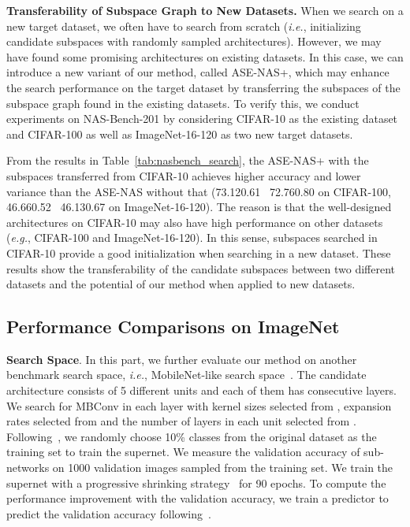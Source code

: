 \documentclass[lettersize,journal]{IEEEtran}
\newcommand{\sexyname}{ASE-NAS\xspace}
\newcommand{\sexynameplus}{ASE-NAS+\xspace}
\def\eg{\emph{e.g.}} \def\Eg{\emph{E.g.}}
\def\ie{\emph{i.e.}} \def\Ie{\emph{I.e.}}
\begin{document}
\textbf{Transferability of Subspace Graph to New Datasets.}
When we search on a new target dataset, we often have to search from scratch (\ie, initializing candidate subspaces with randomly sampled architectures).
However, we may have found some promising architectures on existing datasets.
In this case, we can introduce a new variant of our method, called \sexynameplus, which may enhance the search performance on the target dataset by transferring the subspaces of the subspace graph found in the existing datasets.
To verify this, we conduct experiments on NAS-Bench-201 by considering CIFAR-10 as the existing dataset and CIFAR-100 as well as ImageNet-16-120 as two new target datasets.

From the results in Table~\ref{tab:nasbench_search}, the \sexynameplus with the subspaces transferred from CIFAR-10 achieves higher accuracy and lower variance than the \sexyname without that (73.12{0.61} \vs~72.76{0.80} on CIFAR-100, 46.66{0.52} \vs~46.13{0.67} on ImageNet-16-120).
The reason is that the well-designed architectures on CIFAR-10 may also have high performance on other datasets (\eg, CIFAR-100 and ImageNet-16-120).
In this sense, subspaces searched in CIFAR-10 provide a good initialization when searching in a new dataset.
These results show the transferability of the candidate subspaces between two different datasets and the potential of our method when applied to new datasets.


\subsection{Performance Comparisons on ImageNet}

\textbf{Search Space}.
In this part, we further evaluate our method on another benchmark search space, \ie, MobileNet-like search space~\cite{howard2019searching}.
The candidate architecture consists of 5 different units and each of them has consecutive layers.
We search for MBConv in each layer with kernel sizes selected from , expansion rates selected from  and the number of layers in each unit selected from .
Following~\cite{wu2019fbnet}, we randomly choose 10\% classes from the original dataset as the training set to train the supernet.
We measure the validation accuracy of sub-networks on 1000 validation images sampled from the training set.
We train the supernet with a progressive shrinking strategy~\cite{Cai2020Once} for 90 epochs.
To compute the performance improvement  with the validation accuracy, we train a predictor to predict the validation accuracy following~\cite{Cai2020Once}. 
\end{document}
